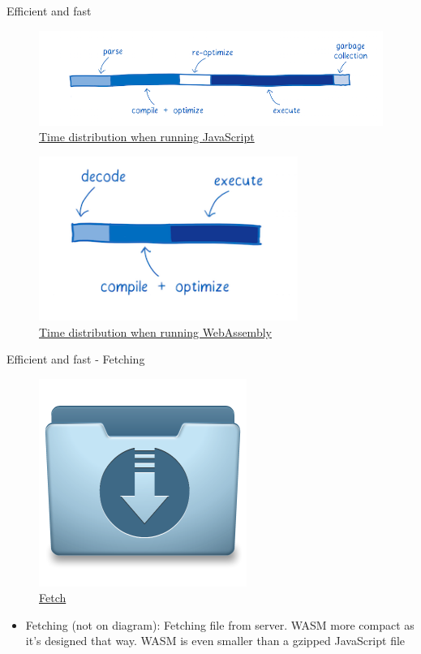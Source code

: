 \documentclass{beamer}
\begin{document}
\begin{frame}{Efficient and fast}
    \begin{figure}
        \includegraphics[scale=0.3]{./images/javascriptgraph.png}
        \caption{\href{https://www.smashingmagazine.com/2017/05/abridged-cartoon-introduction-webassembly/}{Time distribution when running JavaScript}}
    \end{figure}
    \begin{figure}
        \includegraphics[scale=0.4]{./images/wasmgraph.png}
        \caption{\href{https://www.smashingmagazine.com/2017/05/abridged-cartoon-introduction-webassembly/}{Time distribution when running WebAssembly}}
    \end{figure}
\end{frame}

\begin{frame}{Efficient and fast - Fetching}
    \begin{figure}
        \includegraphics[scale=0.2]{./images/file.jpg}
        \caption{\href{https://icon-library.com/icon/download-icon-file-4.html}{Fetch}}
    \end{figure}
    \begin{itemize}
        \item Fetching (not on diagram): Fetching file from server. WASM more compact as it's designed that way. WASM is even smaller than a gzipped JavaScript file
    \end{itemize}
\end{frame}
\end{document}
